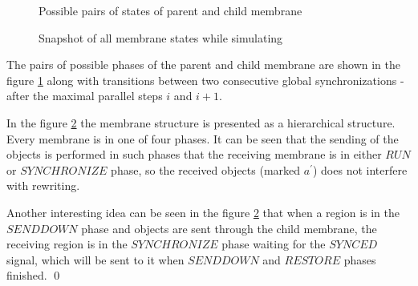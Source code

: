 \begin{dokaz}
  \begin{figure}
    \def\svgwidth{\textwidth}
    
    \caption{Possible pairs of states of parent and child membrane}
    \label{fig:possible_pairs_of_states_of_parent_and_child_membrane}
  \end{figure}

  \begin{figure}
    \def\svgwidth{\textwidth}
    
    \caption{Snapshot of all membrane states while simulating}
    \label{fig:snapshot_of_all_membrane_states_while_simulating}
  \end{figure}

  The pairs of possible phases of the parent and child membrane are shown in the figure \ref{fig:possible_pairs_of_states_of_parent_and_child_membrane} along with transitions between two consecutive global synchronizations - after the maximal parallel steps $i$ and $i+1$.

  In the figure \ref{fig:snapshot_of_all_membrane_states_while_simulating} the membrane structure is presented as a hierarchical structure. Every membrane is in one of four phases. It can be seen that the sending of the objects is performed in such phases that the receiving membrane is in either $\mathit{RUN}$ or $\mathit{SYNCHRONIZE}$ phase, so the received objects (marked $a^\prime$) does not interfere with rewriting.

  Another interesting idea can be seen in the figure \ref{fig:snapshot_of_all_membrane_states_while_simulating} that when a region is in the $\mathit{SENDDOWN}$ phase and objects are sent through the child membrane, the receiving region is in the $\mathit{SYNCHRONIZE}$ phase waiting for the $\mathit{SYNCED}$ signal, which will be sent to it when $\mathit{SENDDOWN}$ and $\mathit{RESTORE}$ phases finished. \qed

\end{dokaz}
